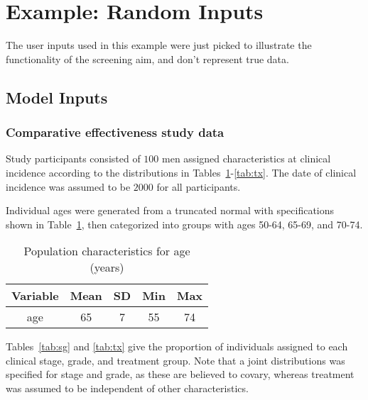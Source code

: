 \documentclass[11pt]{article}
\begin{document}
\section{Example: {\color{red}Random Inputs}}

The user inputs used in this example were just picked to illustrate the functionality of the screening aim, and don't represent true data.

\subsection{Model Inputs}


\subsubsection{Comparative effectiveness study data}

Study participants consisted of $100$ men assigned characteristics at clinical incidence according to the distributions in Tables~\ref{tab:age}-\ref{tab:tx}. 
The date of clinical incidence was assumed to be $2000$ for all participants.

Individual ages were generated from a truncated normal with specifications shown in Table~\ref{tab:age}, then categorized into groups with ages 50-64, 65-69, and 70-74.


\begin{table}[!ht]
\centering
\begin{tabular}{ccccc}
  \hline
Variable & Mean & SD & Min & Max \\ 
  \hline
age & 65 & 7 & 55 & 74 \\ 
   \hline
\end{tabular}
\caption{Population characteristics for age (years)} 
\label{tab:age}
\end{table}

Tables~\ref{tab:sg} and \ref{tab:tx} give the proportion of individuals assigned to each clinical stage, grade, and treatment group.
Note that a joint distributions was specified for stage and grade, as these are believed to covary, whereas treatment was assumed to be independent of other characteristics.
\end{document}
